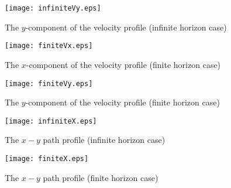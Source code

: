 \documentclass[conference]{IEEEtran}
\begin{document}
\begin{figure}[h!]
    \centering\vspace{0.0cm}
    \texttt{[image: infiniteVy.eps]}\vspace{0.0cm}
	\caption{The $y$-component of the velocity profile (infinite horizon case)}\vspace{0.0cm}
	\label{myfig:2}
\end{figure}

\begin{figure}[h!]
    \centering\vspace{0.0cm}
    \texttt{[image: finiteVx.eps]}\vspace{0.0cm}
	\caption{The $x$-component of the velocity profile (finite horizon case)}\vspace{0.0cm}
	\label{myfig:3}
\end{figure}

\begin{figure}[h!]
    \centering\vspace{0.0cm}
    \texttt{[image: finiteVy.eps]}\vspace{0.0cm}
	\caption{The $y$-component of the velocity profile (finite horizon case)}\vspace{0.0cm}
	\label{myfig:4}
\end{figure}

\begin{figure}[h!]
    \centering\vspace{0.0cm}
    \texttt{[image: infiniteX.eps]}\vspace{0.0cm}
	\caption{The $x-y$ path profile (infinite horizon case)}\vspace{0.0cm}
	\label{myfig:5}
\end{figure}

\begin{figure}[h!]
    \centering\vspace{0.0cm}
    \texttt{[image: finiteX.eps]}\vspace{0.0cm}
	\caption{The $x-y$ path profile (finite horizon case)}\vspace{0.0cm}
	\label{myfig:6}
\end{figure}
\end{document}
